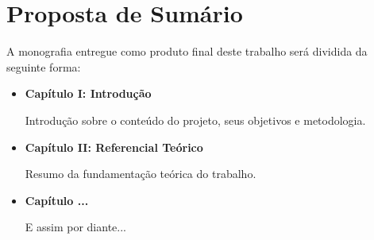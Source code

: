 
\section{Proposta de Sumário}
\label{chap-sumario}

A monografia entregue como produto final deste trabalho será dividida da seguinte forma:

\begin{itemize}
	\item \textbf{Capítulo I: Introdução}
	
	Introdução sobre o conteúdo do projeto, seus objetivos e metodologia.
	
	\item \textbf{Capítulo II: Referencial Teórico}
	
	Resumo da fundamentação teórica do trabalho.
	
	\item \textbf{Capítulo ...}
	
	E assim por diante...	
\end{itemize}